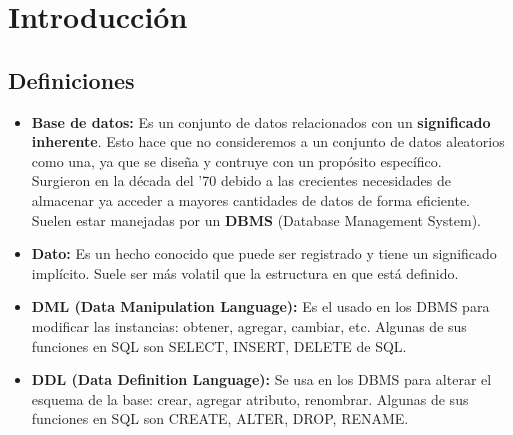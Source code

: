 \section*{Introducción}

\subsection*{Definiciones}
\begin{itemize}
    \item \textbf{Base de datos:} Es un conjunto de datos relacionados con un \textbf{significado inherente}. Esto hace que no consideremos a un conjunto de datos aleatorios como una, ya que se diseña y contruye con un propósito específico. \\
    Surgieron en la década del '70 debido a las crecientes necesidades de almacenar ya acceder a mayores cantidades de datos de forma eficiente. Suelen estar manejadas por un \textbf{DBMS} (Database Management System).
    \item \textbf{Dato:} Es un hecho conocido que puede ser registrado y tiene un significado implícito. Suele ser más volatil que la estructura en que está definido.
    \item \textbf{DML (Data Manipulation Language):} Es el usado en los DBMS para modificar las instancias: obtener, agregar, cambiar, etc. Algunas de sus funciones en SQL son SELECT, INSERT, DELETE de SQL.
    \item \textbf{DDL (Data Definition Language):} Se usa en los DBMS para alterar el esquema de la base: crear, agregar atributo, renombrar. Algunas de sus funciones en SQL son CREATE, ALTER, DROP, RENAME.
\end{itemize}

